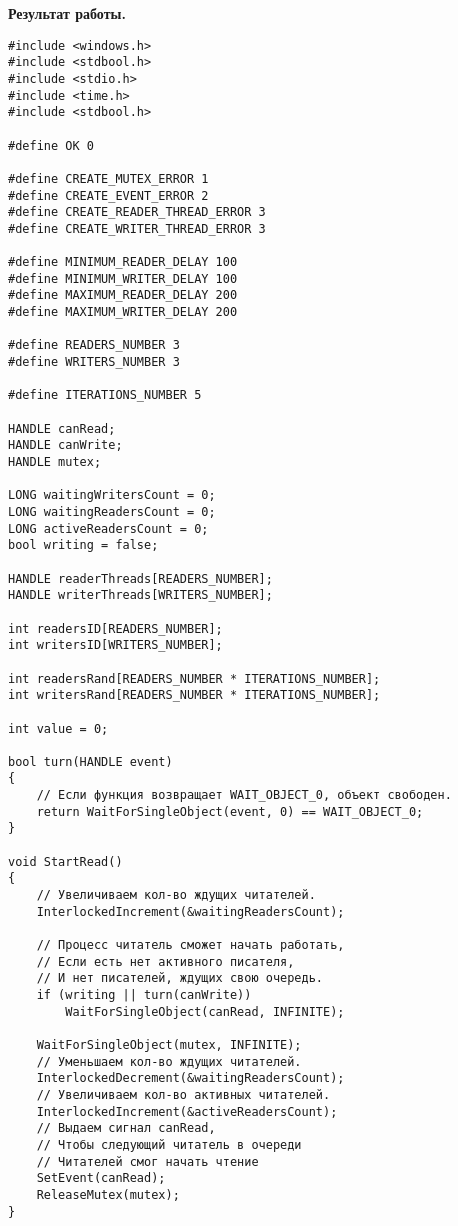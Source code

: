 \textbf{Результат работы.}

\begin{figure}[ht!]
\end{figure}


\newpage

\begin{lstlisting}[label=some-code,caption=Код программы]
#include <windows.h>
#include <stdbool.h>
#include <stdio.h>
#include <time.h>
#include <stdbool.h>

#define OK 0

#define CREATE_MUTEX_ERROR 1
#define CREATE_EVENT_ERROR 2
#define CREATE_READER_THREAD_ERROR 3
#define CREATE_WRITER_THREAD_ERROR 3

#define MINIMUM_READER_DELAY 100
#define MINIMUM_WRITER_DELAY 100
#define MAXIMUM_READER_DELAY 200
#define MAXIMUM_WRITER_DELAY 200

#define READERS_NUMBER 3
#define WRITERS_NUMBER 3

#define ITERATIONS_NUMBER 5

HANDLE canRead;
HANDLE canWrite;
HANDLE mutex;

LONG waitingWritersCount = 0;
LONG waitingReadersCount = 0;
LONG activeReadersCount = 0;
bool writing = false;

HANDLE readerThreads[READERS_NUMBER];
HANDLE writerThreads[WRITERS_NUMBER];

int readersID[READERS_NUMBER];
int writersID[WRITERS_NUMBER];

int readersRand[READERS_NUMBER * ITERATIONS_NUMBER];
int writersRand[READERS_NUMBER * ITERATIONS_NUMBER];

int value = 0;

bool turn(HANDLE event)
{
	// Если функция возвращает WAIT_OBJECT_0, объект свободен.
	return WaitForSingleObject(event, 0) == WAIT_OBJECT_0;
}

void StartRead()
{
	// Увеличиваем кол-во ждущих читателей.
	InterlockedIncrement(&waitingReadersCount);

	// Процесс читатель сможет начать работать,
	// Если есть нет активного писателя,
	// И нет писателей, ждущих свою очередь.
	if (writing || turn(canWrite))
		WaitForSingleObject(canRead, INFINITE);

	WaitForSingleObject(mutex, INFINITE);
	// Уменьшаем кол-во ждущих читателей.
	InterlockedDecrement(&waitingReadersCount);
	// Увеличиваем кол-во активных читателей.
	InterlockedIncrement(&activeReadersCount);
	// Выдаем сигнал canRead,
	// Чтобы следующий читатель в очереди
	// Читателей смог начать чтение
	SetEvent(canRead);
	ReleaseMutex(mutex);
}


\end{lstlisting}
